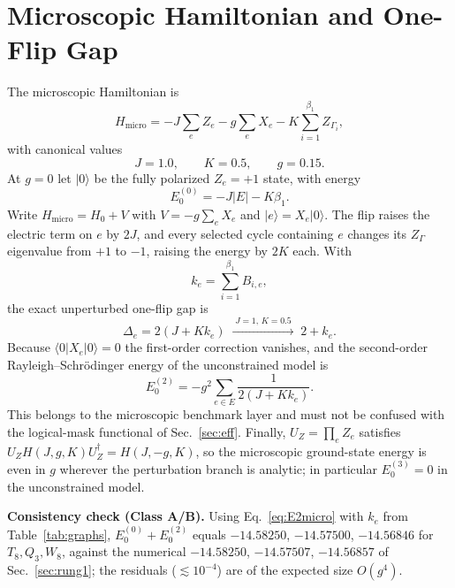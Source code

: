 \documentclass[10pt,twocolumn]{article}
\theoremstyle{definition}
\newcommand{\Hmicro}{H_{\mathrm{micro}}}
\begin{document}
\section{Microscopic Hamiltonian and One-Flip Gap}
The microscopic Hamiltonian is
\begin{equation}
\Hmicro=-J\sum_{e}Z_e-g\sum_{e}X_e-K\sum_{i=1}^{\beta_1}Z_{\Gamma_i}, \label{eq:Hmicro}
\end{equation}
with canonical values
\begin{equation}
J=1.0,\qquad K=0.5,\qquad g=0.15. \label{eq:params}
\end{equation}
At $g=0$ let $|0\rangle$ be the fully polarized $Z_e=+1$ state, with energy
\begin{equation}
E_0^{(0)}=-J|E|-K\beta_1. \label{eq:E0}
\end{equation}
Write $\Hmicro=H_0+V$ with $V=-g\sum_eX_e$ and $|e\rangle=X_e|0\rangle$. The flip raises the electric term on $e$ by $2J$, and every selected cycle containing $e$ changes its $Z_\Gamma$ eigenvalue from $+1$ to $-1$, raising the energy by $2K$ each. With
\begin{equation}
k_e=\sum_{i=1}^{\beta_1}B_{i,e}, \label{eq:ke}
\end{equation}
the exact unperturbed one-flip gap is
\begin{equation}
\Delta_e=2(J+Kk_e)\;\xrightarrow{\;J=1,\,K=0.5\;}\;2+k_e. \label{eq:gap}
\end{equation}
Because $\langle0|X_e|0\rangle=0$ the first-order correction vanishes, and the second-order Rayleigh--Schr\"odinger energy of the unconstrained model is
\begin{equation}
E_0^{(2)}=-g^2\sum_{e\in E}\frac{1}{2(J+Kk_e)}. \label{eq:E2micro}
\end{equation}
This belongs to the microscopic benchmark layer and must not be confused with the logical-mask functional of Sec.~\ref{sec:eff}. Finally, $U_Z=\prod_eZ_e$ satisfies $U_ZH(J,g,K)U_Z^\dagger=H(J,-g,K)$, so the microscopic ground-state energy is even in $g$ wherever the perturbation branch is analytic; in particular $E_0^{(3)}=0$ in the unconstrained model.

\textbf{Consistency check (Class A/B).} Using Eq.~\eqref{eq:E2micro} with $k_e$ from Table~\ref{tab:graphs}, $E_0^{(0)}+E_0^{(2)}$ equals $-14.58250$, $-14.57500$, $-14.56846$ for $T_8,Q_3,W_8$, against the numerical $-14.58250$, $-14.57507$, $-14.56857$ of Sec.~\ref{sec:rung1}; the residuals ($\lesssim10^{-4}$) are of the expected size $O(g^4)$.
\end{document}

